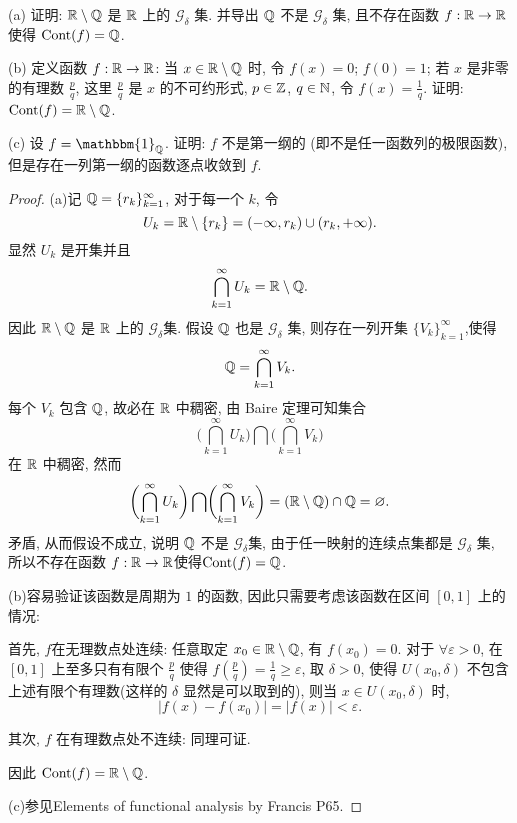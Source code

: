 \begin{exercise}
    (a) 证明: $\mathbb{R}\setminus\mathbb{Q}$ 是 $\mathbb{R}$ 上的 $\mathcal{G}_{\delta}$ 集.
    并导出 $\mathbb{Q}$ 不是 $\mathcal{G}_{\delta}$ 集, 且不存在函数 $f:\mathbb{R}\to\mathbb{R}$ 使得 $\mathrm{Cont}(f)=\mathbb{Q}$.

    (b) 定义函数 $f:\mathbb{R}\to\mathbb{R}$: 当 $x\in\mathbb{R}\setminus\mathbb{Q}$ 时, 令 $f(x)=0$; $f(0)=1$;
    若 $x$ 是非零的有理数 $\frac{p}{q}$, 这里 $\frac{p}{q}$ 是 $x$ 的不可约形式, $p\in\mathbb{Z}$,
    $q\in\mathbb{N}$, 令 $f(x)=\frac{1}{q}$. 证明: $\mathrm{Cont}(f)=\mathbb{R}\setminus\mathbb{Q}$.

    (c) 设 $f=\mathbbm{1}_{\FQ}$. 证明: $f$ 不是第一纲的 (即不是任一函数列的极限函数),
    但是存在一列第一纲的函数逐点收敛到 $f$.
\end{exercise}

\begin{proof}
    (a)记 $\mathbb{Q}=\{r_k\}_{k=1}^{\infty}$, 对于每一个 $k$, 令
    \[U_k=\mathbb{R}\setminus\{r_k\}=(-\infty,r_k)\cup(r_k,+\infty).\]
    显然 $U_k$ 是开集并且
    \[\bigcap_{k=1}^{\infty}U_k=\mathbb{R}\setminus\mathbb{Q}.\]
    因此 $\mathbb{R}\setminus\mathbb{Q}$ 是 $\mathbb{R}$ 上的 $\mathcal{G}_{\delta}$集.
    假设 $\mathbb{Q}$ 也是 $\mathcal{G}_{\delta}$ 集, 则存在一列开集 $\{V_k\}_{k=1}^{\infty}$,使得
    \[\mathbb{Q}=\bigcap_{k=1}^{\infty}V_k.\]
    每个 $V_k$ 包含 $\mathbb{Q}$, 故必在 $\mathbb{R}$ 中稠密, 由 Baire 定理可知集合
    \[\biggl(\bigcap_{k=1}^{\infty}U_k\biggr)\bigcap\biggl(\bigcap_{k=1}^{\infty}V_k\biggr)\]
    在 $\mathbb{R}$ 中稠密, 然而
    \[\biggl(\bigcap_{k=1}^{\infty}U_k\biggr)\bigcap\biggl(\bigcap_{k=1}^{\infty}V_k\biggr)=(\mathbb{R}\setminus\mathbb{Q})\cap\mathbb{Q}=\varnothing.\]
    矛盾, 从而假设不成立, 说明 $\mathbb{Q}$ 不是 $\mathcal{G}_{\delta}$集,
    由于任一映射的连续点集都是 $\mathcal{G}_{\delta}$ 集,
    所以不存在函数 $f:\mathbb{R}\to\mathbb{R}$使得$\textrm{Cont}(f)=\mathbb{Q}$.

    (b)容易验证该函数是周期为 $1$ 的函数, 因此只需要考虑该函数在区间 $[0,1]$ 上的情况:
   
    首先, $f$在无理数点处连续: 任意取定 $x_0\in\mathbb{R}\setminus\mathbb{Q}$,
    有 $f(x_0)=0$. 对于 $\forall\varepsilon>0$, 在 $[0,1]$ 上至多只有有限个 $\frac{p}{q}$
    使得 $f(\frac{p}{q})=\frac{1}{q}\geq\varepsilon$, 取 $\delta>0$, 
    使得 $U(x_0,\delta)$ 不包含上述有限个有理数(这样的 $\delta$ 显然是可以取到的), 则当 $x\in U(x_0,\delta)$ 时,
    \[|f(x)-f(x_0)|=|f(x)|<\varepsilon.\]

    其次, $f$ 在有理数点处不连续: 同理可证.

    因此 $\mathrm{Cont}(f)=\mathbb{R}\setminus\mathbb{Q}$.

    (c)参见Elements of functional analysis by Francis P65.


\end{proof}
